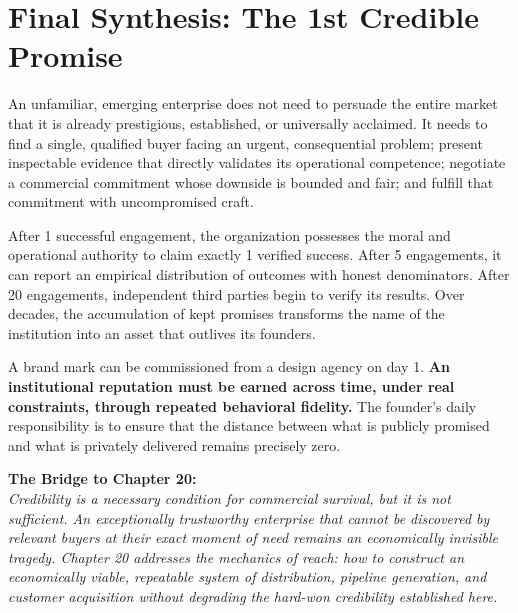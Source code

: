 \section*{Final Synthesis: The 1st Credible Promise}

An unfamiliar, emerging enterprise does not need to persuade the entire market that it is already prestigious, established, or universally acclaimed. It needs to find a single, qualified buyer facing an urgent, consequential problem; present inspectable evidence that directly validates its operational competence; negotiate a commercial commitment whose downside is bounded and fair; and fulfill that commitment with uncompromised craft.

After 1 successful engagement, the organization possesses the moral and operational authority to claim exactly 1 verified success. After 5 engagements, it can report an empirical distribution of outcomes with honest denominators. After 20 engagements, independent third parties begin to verify its results. Over decades, the accumulation of kept promises transforms the name of the institution into an asset that outlives its founders.

A brand mark can be commissioned from a design agency on day 1. \textbf{An institutional reputation must be earned across time, under real constraints, through repeated behavioral fidelity.} The founder's daily responsibility is to ensure that the distance between what is publicly promised and what is privately delivered remains precisely zero.

\vspace{8pt}
\begin{tcolorbox}[
  enhanced,
  colback=BayesPale!40!white,
  colframe=BayesBorder,
  boxrule=0.5pt,
  arc=2.5pt,
  left=9pt,
  right=9pt,
  top=6pt,
  bottom=6pt
]
\textbf{The Bridge to Chapter 20:}\\
\small\itshape
Credibility is a necessary condition for commercial survival, but it is not sufficient. An exceptionally trustworthy enterprise that cannot be discovered by relevant buyers at their exact moment of need remains an economically invisible tragedy. Chapter 20 addresses the mechanics of reach: how to construct an economically viable, repeatable system of distribution, pipeline generation, and customer acquisition without degrading the hard-won credibility established here.
\end{tcolorbox}
